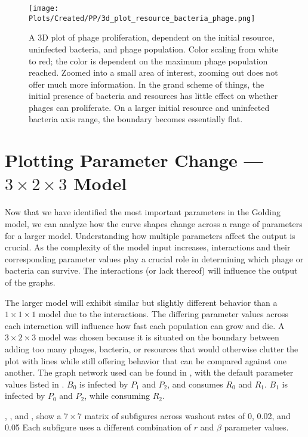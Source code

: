 \begin{figure}[ht!]
    \texttt{[image: Plots/Created/PP/3d\_plot\_resource\_bacteria\_phage.png]}
    \centering
    \caption{
        A 3D plot of phage proliferation, dependent on the initial resource, uninfected bacteria, and phage population. 
        Color scaling from white to red; the color is dependent on the maximum phage population reached. 
        Zoomed into a small area of interest, zooming out does not offer much more information. 
        In the grand scheme of things, the initial presence of bacteria and resources has little effect on whether phages can proliferate. 
        On a larger initial resource and uninfected bacteria axis range, the boundary becomes essentially flat. 
            \label{fig:created:3D_phase_portrait}
    }
\end{figure}

\section{Plotting Parameter Change — $3\times 2\times 3$ Model}
Now that we have identified the most important parameters in the Golding model, we can analyze how the curve shapes change across a range of parameters for a larger model. 
Understanding how multiple parameters affect the output is crucial. 
As the complexity of the model input increases, interactions and their corresponding parameter values play a crucial role in determining which phage or bacteria can survive. 
The interactions (or lack thereof) will influence the output of the graphs. 

The larger model will exhibit similar but slightly different behavior than a $1\times 1\times 1$ model due to the interactions. 
The differing parameter values across each interaction will influence how fast each population can grow and die. 
A $3\times 2\times 3$ model was chosen because it is situated on the boundary between adding too many phages, bacteria, or resources that would otherwise clutter the plot with lines while still offering behavior that can be compared against one another. 
The graph network used can be found in , with the default parameter values listed in . 
$B_0$ is infected by $P_1$ and $P_2$, and consumes $R_0$ and $R_1$. 
$B_1$ is infected by $P_0$ and $P_2$, while consuming $R_2$. 

, , and , show a $7\times7$ matrix of subfigures across washout rates of 0, 0.02, and 0.05
Each subfigure uses a different combination of $r$ and $\beta$ parameter values. 

